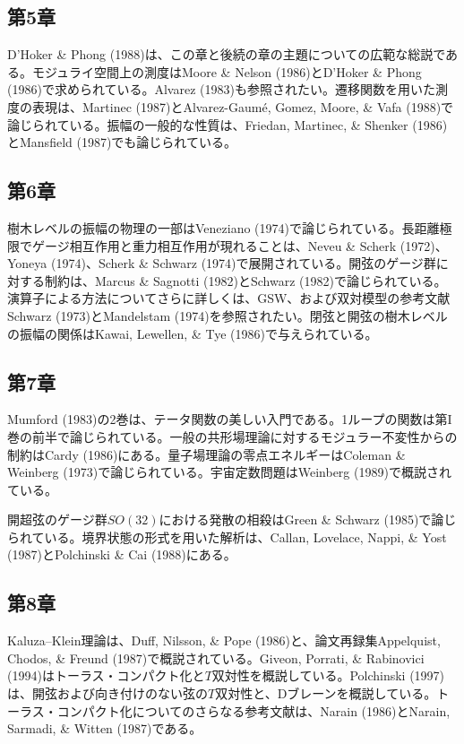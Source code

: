 \subsection*{第5章}
D'Hoker \& Phong (1988)は、この章と後続の章の主題についての広範な総説である。モジュライ空間上の測度はMoore \& Nelson (1986)とD'Hoker \& Phong (1986)で求められている。Alvarez (1983)も参照されたい。遷移関数を用いた測度の表現は、Martinec (1987)とAlvarez-Gaumé, Gomez, Moore, \& Vafa (1988)で論じられている。振幅の一般的な性質は、Friedan, Martinec, \& Shenker (1986)とMansfield (1987)でも論じられている。

\subsection*{第6章}
樹木レベルの振幅の物理の一部はVeneziano (1974)で論じられている。長距離極限でゲージ相互作用と重力相互作用が現れることは、Neveu \& Scherk (1972)、Yoneya (1974)、Scherk \& Schwarz (1974)で展開されている。開弦のゲージ群に対する制約は、Marcus \& Sagnotti (1982)とSchwarz (1982)で論じられている。演算子による方法についてさらに詳しくは、GSW、および双対模型の参考文献Schwarz (1973)とMandelstam (1974)を参照されたい。閉弦と開弦の樹木レベルの振幅の関係はKawai, Lewellen, \& Tye (1986)で与えられている。

\subsection*{第7章}
Mumford (1983)の2巻は、テータ関数の美しい入門である。1ループの関数は第I巻の前半で論じられている。一般の共形場理論に対するモジュラー不変性からの制約はCardy (1986)にある。量子場理論の零点エネルギーはColeman \& Weinberg (1973)で論じられている。宇宙定数問題はWeinberg (1989)で概説されている。

開超弦のゲージ群$SO(32)$における発散の相殺はGreen \& Schwarz (1985)で論じられている。境界状態の形式を用いた解析は、Callan, Lovelace, Nappi, \& Yost (1987)とPolchinski \& Cai (1988)にある。

\subsection*{第8章}
Kaluza--Klein理論は、Duff, Nilsson, \& Pope (1986)と、論文再録集Appelquist, Chodos, \& Freund (1987)で概説されている。Giveon, Porrati, \& Rabinovici (1994)はトーラス・コンパクト化と$T$双対性を概説している。Polchinski (1997)は、開弦および向き付けのない弦の$T$双対性と、Dブレーンを概説している。トーラス・コンパクト化についてのさらなる参考文献は、Narain (1986)とNarain, Sarmadi, \& Witten (1987)である。

